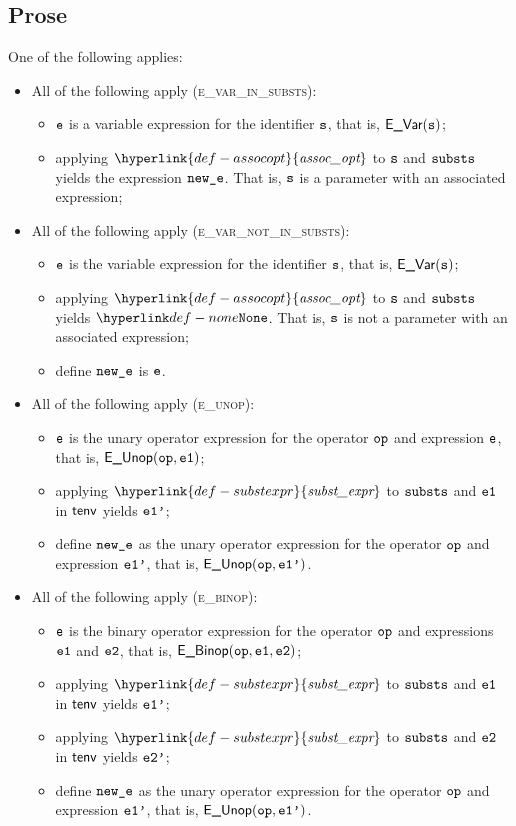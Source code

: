 \documentclass{book}
\newcommand\assocopt[0]{\hyperlink{def-assocopt}{\textfunc{assoc\_opt}}}
\newcommand\substexpr[0]{\hyperlink{def-substexpr}{\textfunc{subst\_expr}}}
\begin{document}
\subsection{Prose}
One of the following applies:
\begin{itemize}
  \item All of the following apply (\textsc{e\_var\_in\_substs}):
  \begin{itemize}
    \item $\texttt{e}$ is a variable expression for the identifier $\texttt{s}$, that is, $\textsf{E\_Var}(\texttt{s})$;
    \item applying $\assocopt$ to $\texttt{s}$ and $\texttt{substs}$ yields the expression $\texttt{new\_e}$.
          That is, $\texttt{s}$ is a parameter with an associated expression;
  \end{itemize}

  \item All of the following apply (\textsc{e\_var\_not\_in\_substs}):
  \begin{itemize}
    \item $\texttt{e}$ is the variable expression for the identifier $\texttt{s}$, that is, $\textsf{E\_Var}(\texttt{s})$;
    \item applying $\assocopt$ to $\texttt{s}$ and $\texttt{substs}$ yields $\None$.
          That is, $\texttt{s}$ is not a parameter with an associated expression;
    \item define $\texttt{new\_e}$ is $\texttt{e}$.
  \end{itemize}

  \item All of the following apply (\textsc{e\_unop}):
  \begin{itemize}
    \item $\texttt{e}$ is the unary operator expression for the operator $\texttt{op}$ and expression $\texttt{e}$, that is, $\textsf{E\_Unop}(\texttt{op}, \texttt{e1})$;
    \item applying $\substexpr$ to $\texttt{substs}$ and $\texttt{e1}$ in $\textsf{tenv}$ yields $\texttt{e1'}$;
    \item define $\texttt{new\_e}$ as the unary operator expression for the operator $\texttt{op}$ and expression $\texttt{e1'}$, that is, $\textsf{E\_Unop}(\texttt{op}, \texttt{e1'})$.
  \end{itemize}

  \item All of the following apply (\textsc{e\_binop}):
  \begin{itemize}
    \item $\texttt{e}$ is the binary operator expression for the operator $\texttt{op}$ and expressions $\texttt{e1}$ and $\texttt{e2}$, that is, $\textsf{E\_Binop}(\texttt{op}, \texttt{e1}, \texttt{e2})$;
    \item applying $\substexpr$ to $\texttt{substs}$ and $\texttt{e1}$ in $\textsf{tenv}$ yields $\texttt{e1'}$;
    \item applying $\substexpr$ to $\texttt{substs}$ and $\texttt{e2}$ in $\textsf{tenv}$ yields $\texttt{e2'}$;
    \item define $\texttt{new\_e}$ as the unary operator expression for the operator $\texttt{op}$ and expression $\texttt{e1'}$, that is, $\textsf{E\_Unop}(\texttt{op}, \texttt{e1'})$.
  \end{itemize}


\end{itemize}
\end{document}
